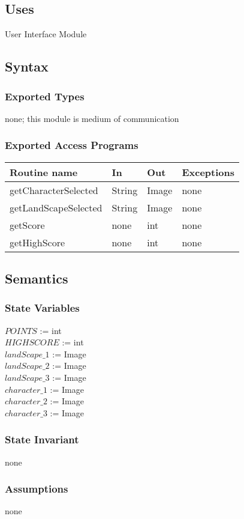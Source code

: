 \documentclass[12pt, titlepage]{article}
\begin{document}
\subsection {Uses}
User Interface Module
\subsection {Syntax}
\subsubsection {Exported Types}
none; this module is medium of communication
\subsubsection {Exported Access Programs}
\begin{tabular}{| l | l | l | l |}
\hline
\textbf{Routine name} & \textbf{In} & \textbf{Out} & \textbf{Exceptions}\\
\hline
getCharacterSelected & String & Image & none\\
\hline
getLandScapeSelected & String &Image & none\\
\hline
getScore& none & int & none\\
\hline
getHighScore & none & int & none\\
\hline
\end{tabular}
\subsection {Semantics}
\subsubsection {State Variables}
$POINTS$ := int\\
$HIGHSCORE$ := int\\
$landScape\_1$ := Image\\
$landScape\_2$ := Image\\
$landScape\_3$ := Image\\
$character\_1$ := Image\\
$character\_2$ := Image\\
$character\_3$ := Image\\
\subsubsection{State Invariant}
none
\subsubsection{Assumptions}
none
\end{document}
